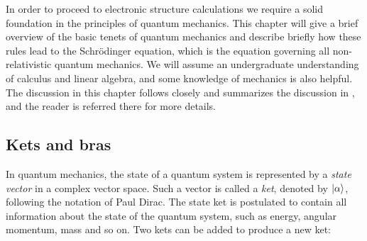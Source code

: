 In order to proceed to electronic structure calculations
we require a solid foundation in the principles of quantum mechanics.
This chapter will give a brief overview of the basic tenets
of quantum mechanics and describe briefly how these rules lead
to the Schr\"{o}dinger equation, which is the equation governing
all non-relativistic quantum mechanics.
We will assume an undergraduate understanding of calculus and linear algebra,
and some knowledge of mechanics is also helpful.
The discussion in this chapter follows closely and summarizes the discussion in
\parencite[Sakurai][pages 10-76]{sakurai1995modern},
and the reader is referred there for more details.

\subsection{Kets and bras}
In quantum mechanics, the state of a quantum system
is represented by a \textit{state vector}
in a complex vector space. Such a vector is called a \textit{ket}, denoted
by $\ket{\alpha}$, following the notation of Paul Dirac.
The state ket is postulated to contain all information
about the state of the quantum system, such as energy, angular momentum,
mass and so on. Two kets can be added to produce a new ket:


